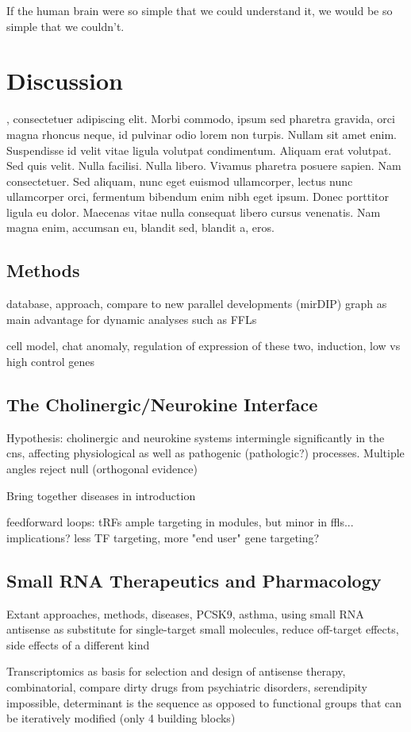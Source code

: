 \begin{savequote}[75mm]
If the human brain were so simple that we could understand it, we would be so simple that we couldn’t.
\end{savequote}

\chapter{Discussion}

, consectetuer adipiscing elit. Morbi commodo, ipsum sed pharetra gravida, orci magna rhoncus neque, id pulvinar odio lorem non turpis. Nullam sit amet enim. Suspendisse id velit vitae ligula volutpat condimentum. Aliquam erat volutpat. Sed quis velit. Nulla facilisi. Nulla libero. Vivamus pharetra posuere sapien. Nam consectetuer. Sed aliquam, nunc eget euismod ullamcorper, lectus nunc ullamcorper orci, fermentum bibendum enim nibh eget ipsum. Donec porttitor ligula eu dolor. Maecenas vitae nulla consequat libero cursus venenatis. Nam magna enim, accumsan eu, blandit sed, blandit a, eros.

\section{Methods} \label{sec:discussion:methods}
database, approach, compare to new parallel developments (mirDIP)
graph as main advantage for dynamic analyses such as FFLs

cell model, chat anomaly, regulation of expression of these two, induction, low vs high control genes


\section{The Cholinergic/Neurokine Interface}
Hypothesis: cholinergic and neurokine systems intermingle significantly in the cns, affecting physiological as well as pathogenic (pathologic?) processes. Multiple angles reject null (orthogonal evidence)

Bring together diseases in introduction

feedforward loops: tRFs ample targeting in modules, but minor in ffls... implications? less TF targeting, more "end user" gene targeting?

\section{Small RNA Therapeutics and Pharmacology} \label{sec:discussion:therapy}
Extant approaches, methods, diseases, PCSK9, asthma, using small RNA antisense as substitute for single-target small molecules, reduce off-target effects, side effects of a different kind

Transcriptomics as basis for selection and design of antisense therapy, combinatorial, compare dirty drugs from psychiatric disorders, serendipity impossible, determinant is the sequence as opposed to functional groups that can be iteratively modified (only 4 building blocks)
